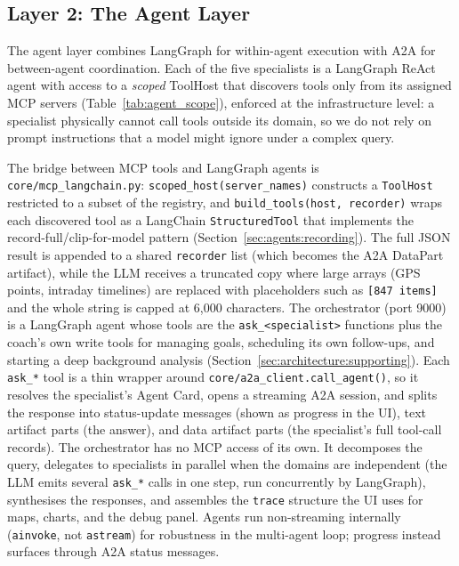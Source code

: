 \subsection{Layer 2: The Agent Layer}\label{sec:architecture:agents}

The agent layer combines LangGraph for within-agent execution with A2A for between-agent coordination. Each of the five specialists is a LangGraph ReAct agent with access to a \textit{scoped} ToolHost that discovers tools only from its assigned MCP servers (Table~\ref{tab:agent_scope}), enforced at the infrastructure level: a specialist physically cannot call tools outside its domain, so we do not rely on prompt instructions that a model might ignore under a complex query.



The bridge between MCP tools and LangGraph agents is \texttt{core/mcp\_langchain.py}: \texttt{scoped\_host(server\_names)} constructs a \texttt{ToolHost} restricted to a subset of the registry, and \texttt{build\_tools(host, recorder)} wraps each discovered tool as a LangChain \texttt{StructuredTool} that implements the record-full/clip-for-model pattern (Section~\ref{sec:agents:recording}). The full JSON result is appended to a shared \texttt{recorder} list (which becomes the A2A DataPart artifact), while the LLM receives a truncated copy where large arrays (GPS points, intraday timelines) are replaced with placeholders such as \texttt{[847 items]} and the whole string is capped at 6{,}000 characters. The orchestrator (port 9000) is a LangGraph agent whose tools are the \texttt{ask\_<specialist>} functions plus the coach's own write tools for managing goals, scheduling its own follow-ups, and starting a deep background analysis (Section~\ref{sec:architecture:supporting}). Each \texttt{ask\_*} tool is a thin wrapper around \texttt{core/a2a\_client.call\_agent()}, so it resolves the specialist's Agent Card, opens a streaming A2A session, and splits the response into status-update messages (shown as progress in the UI), text artifact parts (the answer), and data artifact parts (the specialist's full tool-call records). The orchestrator has no MCP access of its own. It decomposes the query, delegates to specialists in parallel when the domains are independent (the LLM emits several \texttt{ask\_*} calls in one step, run concurrently by LangGraph), synthesises the responses, and assembles the \texttt{trace} structure the UI uses for maps, charts, and the debug panel. Agents run non-streaming internally (\texttt{ainvoke}, not \texttt{astream}) for robustness in the multi-agent loop; progress instead surfaces through A2A status messages.

